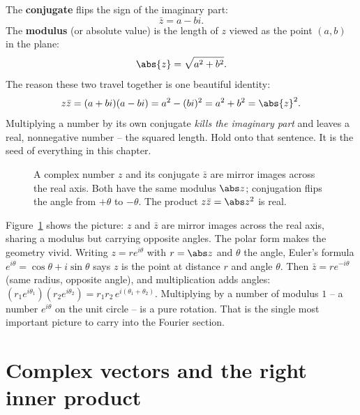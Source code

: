 The \textbf{conjugate} flips the sign of the imaginary part:
\[
  \bar z = a - bi.
\]
The \textbf{modulus} (or absolute value) is the length of $z$ viewed as the point
$(a,b)$ in the plane:
\[
  \abs{z} = \sqrt{a^2+b^2}.
\]
The reason these two travel together is one beautiful identity:
\[
  z\bar z = (a+bi)(a-bi) = a^2 - (bi)^2 = a^2 + b^2 = \abs{z}^2.
\]
Multiplying a number by its own conjugate \emph{kills the imaginary part} and
leaves a real, nonnegative number -- the squared length. Hold onto that sentence.
It is the seed of everything in this chapter.

\begin{figure}[H]
\centering
{}
\caption{A complex number $z$ and its conjugate $\bar z$ are mirror images across
the real axis. Both have the same modulus $\abs z$; conjugation flips the angle
from $+\theta$ to $-\theta$. The product $z\bar z=\abs z^2$ is real.}
\label{ch32:conjugate}
\end{figure}

Figure~\ref{ch32:conjugate} shows the picture: $z$ and $\bar z$ are mirror images
across the real axis, sharing a modulus but carrying opposite angles.
The polar form makes the geometry vivid. Writing $z = r e^{i\theta}$ with
$r=\abs z$ and $\theta$ the angle, Euler's formula $e^{i\theta}=\cos\theta +
i\sin\theta$ says $z$ is the point at distance $r$ and angle $\theta$. Then
$\bar z = r e^{-i\theta}$ (same radius, opposite angle), and multiplication adds
angles: $(r_1e^{i\theta_1})(r_2e^{i\theta_2}) = r_1r_2\,e^{i(\theta_1+\theta_2)}$.
Multiplying by a number of modulus $1$ -- a number $e^{i\theta}$ on the unit
circle -- is a pure rotation. That is the single most important picture to carry
into the Fourier section.

\section{Complex vectors and the right inner product}

